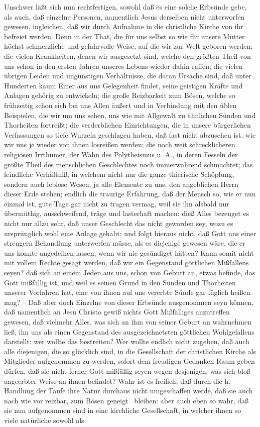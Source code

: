 Unschwer läßt sich nun rechtfertigen, sowohl daß es eine solche Erbsünde gebe, als auch, daß einzelne Personen, namentlich Jesus derselben nicht unterworfen gewesen, ingleichen, daß wir durch Aufnahme in die christliche Kirche von ihr befreiet werden. Denn in der That, die für uns selbst so wie für unsere Mütter höchst schmerzliche und gefahrvolle Weise, auf die wir zur Welt geboren werden; die vielen Krankheiten, denen wir ausgesetzt sind, welche den größten Theil von uns schon in den ersten Jahren unseres Lebens wieder dahin raffen; die vielen übrigen Leiden und ungünstigen Verhältnisse, die daran Ursache sind, daß unter Hunderten kaum Einer aus uns Gelegenheit findet, seine geistigen Kräfte und Anlagen gehörig zu entwickeln; die große Reizbarkeit zum Bösen, welche so frühzeitig schon sich bei uns Allen äußert und in Verbindung mit den üblen Beispielen, die wir um uns sehen, uns wie mit Allgewalt zu ähnlichen Sünden und Thorheiten fortreißt; die verderblichen Einrichtungen, die in unsere bürgerlichen Verfassungen so tiefe Wurzeln geschlagen haben, daß fast nicht abzusehen ist, wie wir uns je wieder von ihnen losreißen werden; die noch weit schrecklicheren religiösen Irrthümer, der Wahn des Polytheismus u. A., in deren Fesseln der größte Theil des menschlichen Geschlechtes noch immerwährend schmachtet; das feindliche Verhältniß, in welchem nicht nur die ganze thierische Schöpfung, sondern auch leblose Wesen, ja alle Elemente zu uns, den angeblichen Herrn dieser Erde stehen; endlich die traurige Erfahrung, daß der Mensch so, wie er nun einmal ist, gute Tage gar nicht zu tragen vermag, weil  sie ihn alsbald nur übermüthig, ausschweifend, träge und lasterhaft machen: dieß Alles bezeuget es nicht nur allzu sehr, daß unser Geschlecht das nicht geworden sey, wozu es ursprünglich wohl eine Anlage gehabt; und folgt hieraus nicht, daß Gott uns einer strengern Behandlung unterwerfen müsse, als es diejenige gewesen wäre, die er uns konnte angedeihen lassen, wenn wir nie gesündiget hätten? Kann somit nicht mit vollem Rechte gesagt werden, daß wir ein Gegenstand göttlichen Mißfallens seyen? daß sich an einem Jeden aus uns, schon von Geburt an, etwas befinde, das Gott mißfällig ist, und weil es seinen Grund in den Sünden und Thorheiten unserer Vorfahren hat, eine von ihnen auf uns vererbte Sünde gar füglich heißen mag? -- Daß aber doch Einzelne von dieser Erbsünde ausgenommen seyn können, daß namentlich an Jesu Christo gewiß nichts Gott Mißfälliges anzutreffen gewesen, daß vielmehr Alles, was sich an ihm von seiner Geburt an wahrnehmen ließ, ihn uns als einen Gegenstand des ausgezeichnetsten göttlichen Wohlgefallens darstellt: wer wollte das bestreiten? Wer wollte endlich nicht zugeben, daß auch alle diejenigen, die so glücklich sind, in die Gesellschaft der christlichen Kirche als Mitglieder aufgenommen zu werden, sofort dem freudigen Gedanken Raum geben dürfen, daß sie nicht ferner Gott mißfällig seyen wegen desjenigen, was sich bloß angeerbter Weise an ihnen befindet? Wahr ist es freilich, daß durch die h. Handlung der Taufe ihre Natur durchaus nicht umgeschaffen werde, daß sie auch nach wie vor reizbar, zum Bösen geneigt \usw\ bleiben: aber auch eben so wahr, daß sie nun aufgenommen sind in eine kirchliche Gesellschaft, in welcher ihnen so viele natürliche sowohl als 